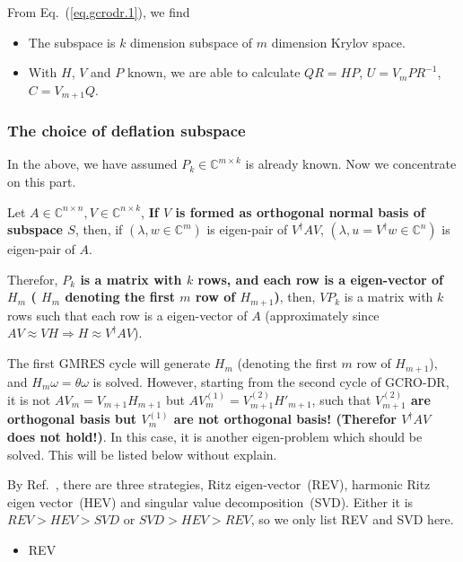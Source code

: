 From Eq.~(\ref{eq.gcrodr.1}), we find

\begin{itemize}
  \item The subspace is $k$ dimension subspace of $m$ dimension Krylov space.
  \item With $H$, $V$ and $P$ known, we are able to calculate $QR=HP$, $U=V_mPR^{-1}$, $C=V_{m+1}Q$.
\end{itemize}

\subsubsection{\label{sec:deflationsubspace}The choice of deflation subspace}

In the above, we have assumed $P_k\in \mathbb{C}^{m\times k}$ is already known. Now we concentrate on this part.

Let $A\in \mathbb{C}^{n\times n},V\in \mathbb{C}^{n\times k}$, \textbf{If $V$ is formed as orthogonal normal basis of subspace $S$}, then, if $(\lambda, w\in \mathbb{C}^m)$ is eigen-pair of $V^{\dagger}AV$, $(\lambda, u=V^{\dagger}w\in \mathbb{C}^n)$ is eigen-pair of $A$.

Therefor, \textcolor[rgb]{0,0,1}{\textbf{$P_k$ is a matrix with $k$ rows, and each row is a eigen-vector of $H_m$ ( $H_m$ denoting the first $m$ row of $H_{m+1}$)}}, then, $VP_k$ is a matrix with $k$ rows such that each row is a eigen-vector of $A$ (approximately since $AV\approx VH \Rightarrow H \approx V^{\dagger}AV$).

The first GMRES cycle will generate $H_m$ (denoting the first $m$ row of $H_{m+1}$), and $H_m\omega=\theta \omega$ is solved. However, starting from the second cycle of GCRO-DR, it is not $AV_m=V_{m+1}H_{m+1}$ but $AV_m^{(1)}=V_{m+1}^{(2)}H'_{m+1}$, such that \textcolor[rgb]{1,0,0}{\textbf{$V_{m+1}^{(2)}$ are orthogonal basis but $V_{m}^{(1)}$ are not orthogonal basis! (Therefor $V^{\dagger}AV$ does not hold!)}}. In this case, it is another eigen-problem which should be solved. This will be listed below without explain.

By Ref.~\cite{deflation}, there are three strategies, Ritz eigen-vector~(REV), harmonic Ritz eigen vector~(HEV) and singular value decomposition~(SVD). Either it is $REV>HEV>SVD$ or $SVD>HEV>REV$, so we only list REV and SVD here.

\begin{itemize}
  \item REV
\end{itemize}

